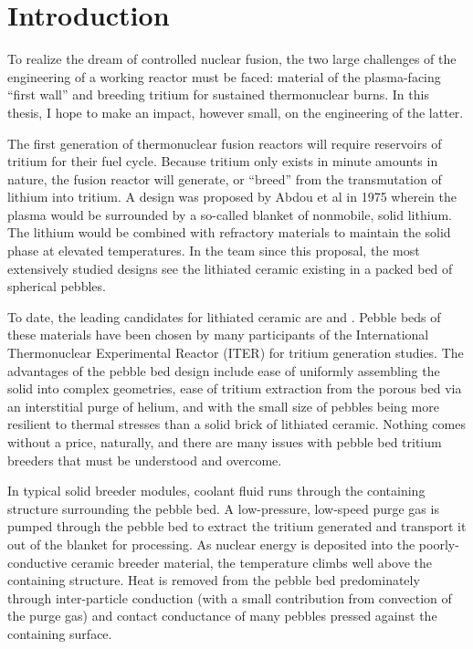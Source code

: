 \chapter{Introduction} \label{sec:introduction}
To realize the dream of controlled nuclear fusion, the two large challenges of the engineering of a working reactor must be faced: material of the plasma-facing ``first wall'' and breeding tritium for sustained thermonuclear burns. In this thesis, I hope to make an impact, however small, on the engineering of the latter. 

The first generation of thermonuclear fusion reactors will require reservoirs of tritium for their fuel cycle. Because tritium only exists in minute amounts in nature, the fusion reactor will generate, or ``breed'' from the transmutation of lithium into tritium. A design was proposed by Abdou et al\cite{Abdou1974d} in 1975 wherein the plasma would be surrounded by a so-called blanket of nonmobile, solid lithium. The lithium would be combined with refractory materials to maintain the solid phase at elevated temperatures. In the team since this proposal, the most extensively studied designs see the lithiated ceramic existing in a packed bed of spherical pebbles.

To date, the leading candidates for lithiated ceramic are \lit and \lis. Pebble beds of these materials have been chosen by many participants of the International Thermonuclear Experimental Reactor (ITER) for tritium generation studies.\cite{Lulewicz2002, Mandal2012a, Tsuchiya1998, Cho2012} The advantages of the pebble bed design include ease of uniformly assembling the solid into complex geometries, ease of tritium extraction from the porous bed via an interstitial purge of helium, and with the small size of pebbles being more resilient to thermal stresses than a solid brick of lithiated ceramic.\cite{Casadio2004} Nothing comes without a price, naturally, and there are many issues with pebble bed tritium breeders that must be understood and overcome.

In typical solid breeder modules, coolant fluid runs through the containing structure surrounding the pebble bed. A low-pressure, low-speed purge gas is pumped through the pebble bed to extract the tritium generated and transport it out of the blanket for processing. As nuclear energy is deposited into the poorly-conductive ceramic breeder material, the temperature climbs well above the containing structure. Heat is removed from the pebble bed predominately through inter-particle conduction (with a small contribution from convection of the purge gas) and contact conductance of many pebbles pressed against the containing surface. 

